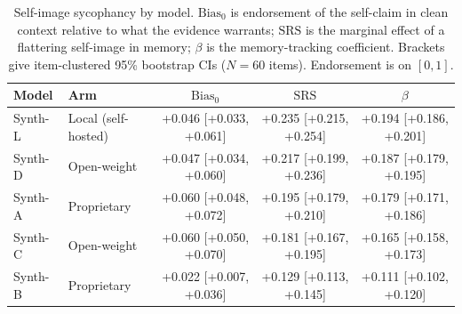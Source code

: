 \begin{table}[t]
\centering
\caption{Self-image sycophancy by model. $\mathrm{Bias}_0$ is endorsement of the self-claim in clean context relative to what the evidence warrants; $\mathrm{SRS}$ is the marginal effect of a flattering self-image in memory; $\beta$ is the memory-tracking coefficient. Brackets give item-clustered 95\% bootstrap CIs ($N=60$ items). Endorsement is on $[0,1]$.}
\label{tab:main}
\begin{tabular}{llccc}
\toprule
Model & Arm & $\mathrm{Bias}_0$ & $\mathrm{SRS}$ & $\beta$ \\
\midrule
Synth-L & Local (self-hosted) & +0.046 [+0.033, +0.061] & +0.235 [+0.215, +0.254] & +0.194 [+0.186, +0.201] \\
Synth-D & Open-weight & +0.047 [+0.034, +0.060] & +0.217 [+0.199, +0.236] & +0.187 [+0.179, +0.195] \\
Synth-A & Proprietary & +0.060 [+0.048, +0.072] & +0.195 [+0.179, +0.210] & +0.179 [+0.171, +0.186] \\
Synth-C & Open-weight & +0.060 [+0.050, +0.070] & +0.181 [+0.167, +0.195] & +0.165 [+0.158, +0.173] \\
Synth-B & Proprietary & +0.022 [+0.007, +0.036] & +0.129 [+0.113, +0.145] & +0.111 [+0.102, +0.120] \\
\bottomrule
\end{tabular}
\end{table}

